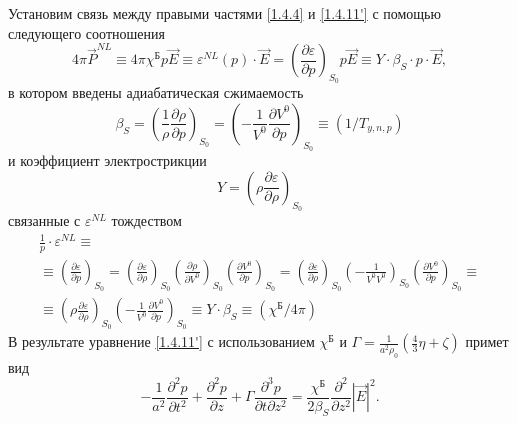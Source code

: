 \documentclass[a4paper]{article}
\begin{document}
Установим связь между правыми частями \eqref{1.4.4} и \eqref{1.4.11'} с помощью следующего соотношения
\begin{equation}
	4\pi\vec{P}^{NL}\equiv4\pi\chi^{\text{Б}}p\vec{E}\equiv\varepsilon^{NL}(p)\cdot\vec{E}=\left(\frac{\partial\varepsilon}{\partial p}\right)_{S_{0}}p\vec{E}\equiv Y\cdot\beta_{S}\cdot p\cdot\vec{E},
	\tag{12'}
	\label{1.4.12}
\end{equation}
в котором введены адиабатическая сжимаемость
\begin{equation}
	\beta_{S}=\left(\frac{1}{\rho}\frac{\partial\rho}{\partial p}\right)_{S_{0}}=\left(-\frac{1}{V^{0}}\frac{\partial V^{0}}{\partial p}\right)_{S_{0}}\equiv(1/T_{y,n,p})
	\tag{7*}\label{1.4.7*}
\end{equation}
и коэффициент электрострикции 
\begin{equation}
	Y=\left(\rho\frac{\partial\varepsilon}{\partial\rho}\right)_{S_{0}}\tag{7**}\label{1.4.7**}
\end{equation}
связанные с $\varepsilon^{NL}$ тождеством 
\setcounter{equation}{7}
\begin{multline}
	\frac{1}{p}\cdot\varepsilon^{NL}\equiv\\
	\equiv\left(\frac{\partial\varepsilon}{\partial p}\right)_{S_{0}}=\left(\frac{\partial\varepsilon}{\partial\rho}\right)_{S_{0}}\left(\frac{\partial\rho}{\partial V^{0}}\right)_{S_{0}}\left(\frac{\partial V^{0}}{\partial p}\right)_{S_{0}}=\left(\frac{\partial\varepsilon}{\partial\rho}\right)_{S_{0}}\left(-\frac{1}{V^{0}V^{0}}\right)_{S_{0}}\left(\frac{\partial V^{0}}{\partial p}\right)_{S_{0}}\equiv\\
	\equiv\left(\rho\frac{\partial\varepsilon}{\partial\rho}\right)_{S_{0}}\left(-\frac{1}{V^{0}}\frac{\partial V^{0}}{\partial p}\right)_{S_{0}}\equiv Y\cdot\beta_{S}\equiv(\chi^{\text{Б}}/4\pi)
	\label{1.4.8}
\end{multline}
В результате уравнение \eqref{1.4.11'} с использованием $\chi^{\text{Б}}$  и $\Gamma=\frac{1}{a^{2}\rho_{0}}\left(\frac{4}{3}\eta+\zeta\right)$ примет вид 
\begin{equation}
	-\frac{1}{a^{2}}\frac{\partial^{2}p}{\partial t^{2}}+\frac{\partial^{2}p}{\partial z}+\Gamma\frac{\partial^{3}p}{\partial t\partial z^{2}}=\frac{\chi^{\text{Б}}}{2\beta_{S}}\frac{\partial^{2}}{\partial z^{2}}\left|\vec{E}\right|^{2}.
	\label{1.4.9}
\end{equation}
\end{document}

